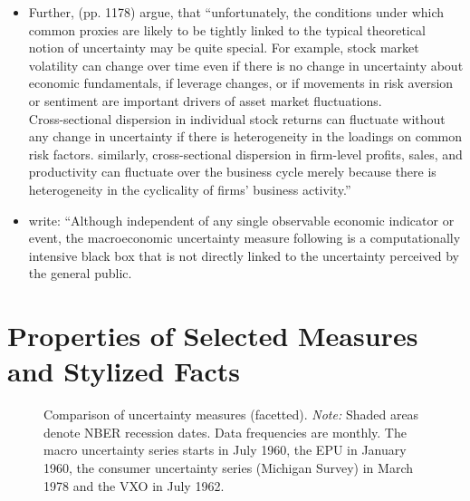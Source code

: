 \documentclass[a4paper,11pt,listof=nochaptergap,oneside,pointednumbers,bibtotoc,bigheadings,liststotoc]{scrbook}
\theoremstyle{mysatz}
\theoremstyle{mydefinition}
\theoremstyle{mybemerkung}
\begin{document}
\begin{itemize}
	\item Further, \citet{juradoetal:15} (pp. 1178) argue, that ``unfortunately, the conditions under which common proxies are likely to be tightly linked to the typical theoretical notion of uncertainty may be quite special. For example, stock market volatility can change over time even if there is no change in uncertainty about economic fundamentals, if leverage changes, or if movements in risk aversion or sentiment are important drivers of asset market fluctuations.\\
Cross-sectional dispersion in individual stock returns can fluctuate without any change in uncertainty if there is heterogeneity in the loadings on common risk factors. similarly, cross-sectional dispersion in firm-level profits, sales, and productivity can fluctuate over the business cycle merely because there is heterogeneity in the cyclicality of firms' business activity.'' 
	\item \citet[p. 13]{bontempietal:16} write: ``Although independent of any single observable economic indicator or event, the macroeconomic uncertainty measure following \citet{juradoetal:15} is a computationally intensive black box that is not directly linked to the uncertainty perceived by the general public.  
\end{itemize}

\section{Properties of Selected Measures and Stylized Facts}
\label{sec:ComparisonOfMeasures}
\begin{figure}[!ht]
   \centering
   \setlength\fboxsep{0pt}
   \setlength\fboxrule{0pt}
      \caption[Comparison of uncertainty measures (facetted).]{Comparison of uncertainty measures (facetted).
      \textit{Note:} Shaded areas denote NBER recession dates. Data frequencies are monthly. The macro uncertainty series starts in July 1960, the EPU in January 1960, the consumer uncertainty series (Michigan Survey) in March 1978 and the VXO in July 1962.}   \label{fig:comparison_plot}
\end{figure}
\end{document}
